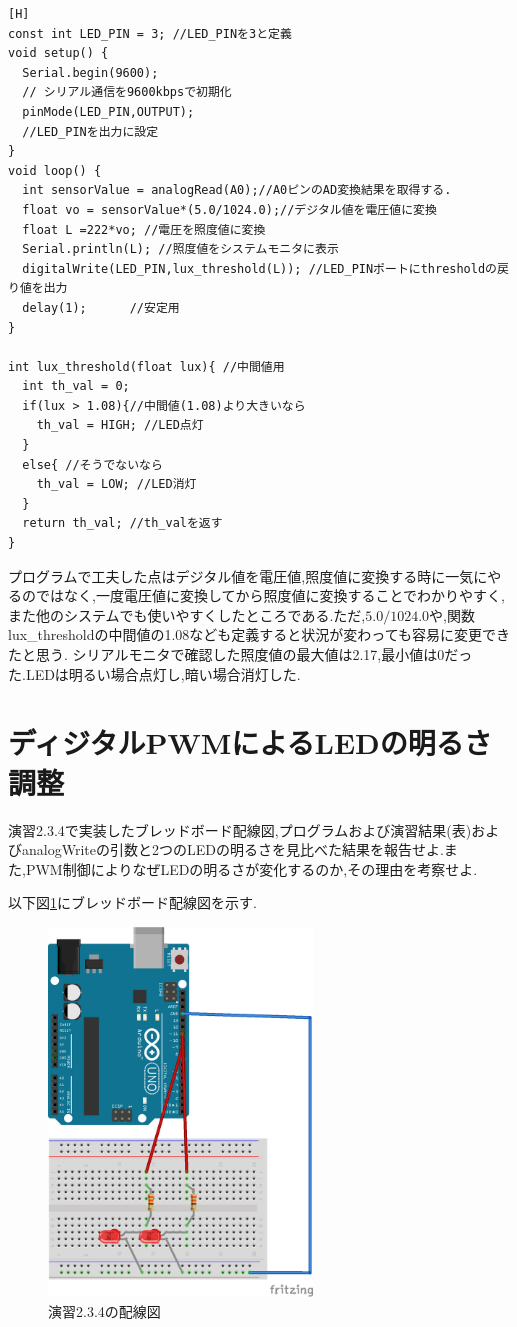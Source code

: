\documentclass{jarticle}
\begin{document}
\begin{lstlisting}[caption = 課題2.3.2,label=code:kadai2-3-2][H]
const int LED_PIN = 3; //LED_PINを3と定義
void setup() {
  Serial.begin(9600);
  // シリアル通信を9600kbpsで初期化
  pinMode(LED_PIN,OUTPUT);
  //LED_PINを出力に設定
}
void loop() {
  int sensorValue = analogRead(A0);//A0ピンのAD変換結果を取得する.
  float vo = sensorValue*(5.0/1024.0);//デジタル値を電圧値に変換
  float L =222*vo; //電圧を照度値に変換
  Serial.println(L); //照度値をシステムモニタに表示
  digitalWrite(LED_PIN,lux_threshold(L)); //LED_PINポートにthresholdの戻り値を出力
  delay(1);      //安定用 
}

int lux_threshold(float lux){ //中間値用
  int th_val = 0;
  if(lux > 1.08){//中間値(1.08)より大きいなら
    th_val = HIGH; //LED点灯
  }
  else{ //そうでないなら
    th_val = LOW; //LED消灯
  }
  return th_val; //th_valを返す
}
\end{lstlisting}

プログラムで工夫した点はデジタル値を電圧値,照度値に変換する時に一気にやるのではなく,一度電圧値に変換してから照度値に変換することでわかりやすく,また他のシステムでも使いやすくしたところである.ただ,$5.0/1024.0$や,関数lux\_thresholdの中間値の1.08なども定義すると状況が変わっても容易に変更できたと思う.
シリアルモニタで確認した照度値の最大値は2.17,最小値は0だった.LEDは明るい場合点灯し,暗い場合消灯した.

\section{ディジタルPWMによるLEDの明るさ調整}

演習2.3.4で実装したブレッドボード配線図,プログラムおよび演習結果(表)およびanalogWriteの引数と2つのLEDの明るさを見比べた結果を報告せよ.また,PWM制御によりなぜLEDの明るさが変化するのか,その理由を考察せよ.

以下図\ref{fig:enshu2-3-4bread}にブレッドボード配線図を示す.

\begin{figure}[H]
\begin{center}
\includegraphics[width=7.0cm]{images/enshu2-3-4_bread.png}
\caption{演習2.3.4の配線図}
\label{fig:enshu2-3-4bread}
\end{center}
\end{figure}
\end{document}
